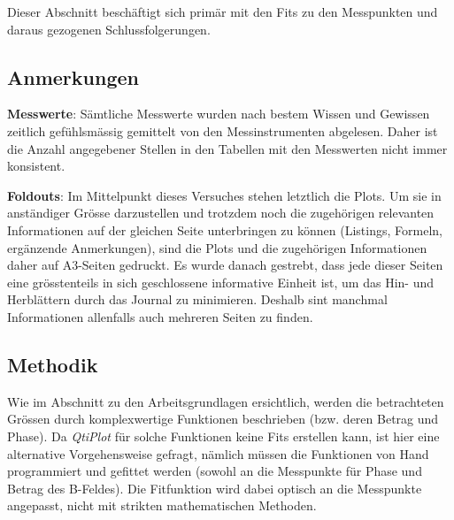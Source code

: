Dieser Abschnitt besch\"aftigt  sich prim\"ar mit den Fits  zu den Messpunkten
und daraus gezogenen Schlussfolgerungen.

\subsection{Anmerkungen}
\label{sec:ausw:subsec:remarks}
\textbf{Messwerte}: S\"amtliche  Messwerte  wurden   nach  bestem  Wissen  und
Gewissen  zeitlich   gef\"uhlsm\"assig  gemittelt  von   den  Messinstrumenten
abgelesen. Daher ist  die Anzahl angegebener  Stellen in den Tabellen  mit den
Messwerten nicht immer konsistent.

\vspace{0.5em}

\noindent
\textbf{Foldouts}: Im  Mittelpunkt  dieses   Versuches  stehen  letztlich  die
Plots.  Um  sie in anst\"andiger  Gr\"osse darzustellen und trotzdem  noch die
zugeh\"origen relevanten Informationen auf  der gleichen Seite unterbringen zu
k\"onnen (Listings, Formeln, erg\"anzende Anmerkungen), sind die Plots und die
zugeh\"origen  Informationen daher  auf  A3-Seiten  gedruckt. Es wurde  danach
gestrebt, dass  jede dieser Seiten  eine gr\"osstenteils in  sich geschlossene
informative Einheit ist, um das  Hin- und  Herbl\"attern durch das  Journal zu
minimieren.   Deshalb sint  manchmal  Informationen  allenfalls auch  mehreren
Seiten zu finden.


\subsection{Methodik}
\label{sec:ausw:subsec:methodik}

Wie im Abschnitt zu den Arbeitsgrundlagen ersichtlich, werden die betrachteten
Gr\"ossen durch  komplexwertige Funktionen beschrieben (bzw.  deren Betrag und
Phase). Da \emph{QtiPlot}  f\"ur solche Funktionen keine  Fits erstellen kann,
ist  hier  eine alternative  Vorgehensweise  gefragt,  n\"amlich m\"ussen  die
Funktionen von Hand programmiert und gefittet werden (sowohl an die Messpunkte
f\"ur Phase  und Betrag des  B-Feldes). Die Fitfunktion wird dabei  optisch an
die Messpunkte angepasst, nicht mit strikten mathematischen Methoden.

